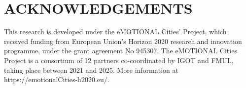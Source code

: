 \documentclass{isprs} %
\begin{document}












\section*{ACKNOWLEDGEMENTS}\label{ACKNOWLEDGEMENTS}
This research is developed under the eMOTIONAL Cities' Project, which received funding from European Union’s Horizon 2020 research and innovation programme, under the grant agreement No 945307. The eMOTIONAL Cities Project is a consortium of 12 partners co-coordinated by IGOT and FMUL, taking place between 2021 and 2025. More information at https://emotionalCities-h2020.eu/.
\end{document}
